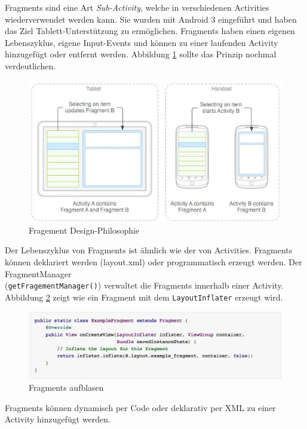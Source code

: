 Fragments sind eine Art \emph{Sub-Activity}, welche in verschiedenen Activities wiederverwendet werden kann. Sie wurden mit Android 3 eingeführt und haben das Ziel Tablett-Unterstützung zu ermöglichen. Fragments haben einen eigenen Lebenszyklus, eigene Input-Events und können zu einer laufenden Activity hinzugefügt oder entfernt werden. Abbildung \ref{fig:fragment-design} sollte das Prinzip nochmal verdeutlichen.

\begin{figure}
\centering
\includegraphics[width=0.7\linewidth]{fig/fragment-design}
\caption{Fragement Design-Philosophie}
\label{fig:fragment-design}
\end{figure}

Der Lebenszyklus von Fragments ist ähnlich wie der von Activities. Fragments können deklariert werden (layout.xml) oder programmatisch erzeugt werden. Der FragmentManager \\ (\texttt{getFragementManager()}) verwaltet die Fragments innerhalb einer Activity. Abbildung \ref{fig:fragement-aufblasen} zeigt wie ein Fragment mit dem \texttt{LayoutInflater} erzeugt wird.

\begin{figure}
\centering
\includegraphics[width=0.7\linewidth]{fig/fragement-aufblasen}
\caption{Fragments aufblasen}
\label{fig:fragement-aufblasen}
\end{figure}

Fragments können dynamisch per Code oder deklarativ per XML zu einer Activity hinzugefügt werden.

